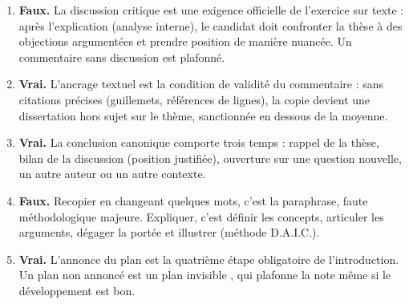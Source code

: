 \documentclass[11pt]{article}
\begin{document}
\begin{exoresolu}
\begin{enumerate}
\item \textbf{Faux.} La discussion critique est une exigence officielle de l'exercice sur texte : après l'explication (analyse interne), le candidat doit confronter la thèse à des objections argumentées et prendre position de manière nuancée. Un commentaire sans discussion est plafonné.
\item \textbf{Vrai.} L'ancrage textuel est la condition de validité du commentaire : sans citations précises (guillemets, références de lignes), la copie devient une dissertation hors sujet sur le thème, sanctionnée en dessous de la moyenne.
\item \textbf{Vrai.} La conclusion canonique comporte trois temps : rappel de la thèse, bilan de la discussion (position justifiée), ouverture sur une question nouvelle, un autre auteur ou un autre contexte.
\item \textbf{Faux.} Recopier en changeant quelques mots, c'est la paraphrase, faute méthodologique majeure. Expliquer, c'est définir les concepts, articuler les arguments, dégager la portée et illustrer (méthode D.A.I.C.).
\item \textbf{Vrai.} L'annonce du plan est la quatrième étape obligatoire de l'introduction. Un plan non annoncé est un \og plan invisible \fg, qui plafonne la note même si le développement est bon.
\end{enumerate}
\end{exoresolu}
\end{document}
